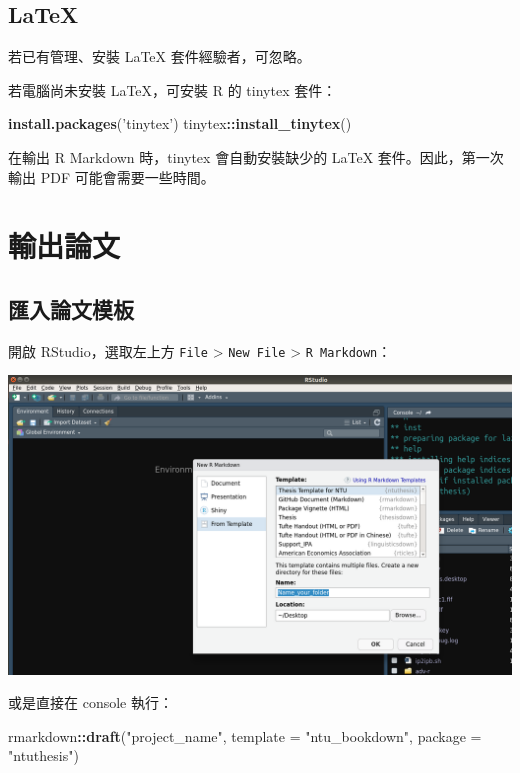 \documentclass[oneside]{book}
\newenvironment{Shaded}{\begin{snugshade}}{\end{snugshade}}
\newcommand{\KeywordTok}[1]{\textcolor[rgb]{0.13,0.29,0.53}{\textbf{#1}}}
\newcommand{\DataTypeTok}[1]{\textcolor[rgb]{0.13,0.29,0.53}{#1}}
\newcommand{\StringTok}[1]{\textcolor[rgb]{0.31,0.60,0.02}{#1}}
\newcommand{\OperatorTok}[1]{\textcolor[rgb]{0.81,0.36,0.00}{\textbf{#1}}}
\newcommand{\NormalTok}[1]{#1}
\begin{document}
\section{LaTeX}\label{latex}

若已有管理、安裝 LaTeX 套件經驗者，可忽略。

若電腦尚未安裝 LaTeX，可安裝 R 的 tinytex 套件：

\begin{Shaded}
\begin{Highlighting}[]
\KeywordTok{install.packages}\NormalTok{(}\StringTok{'tinytex'}\NormalTok{)}
\NormalTok{tinytex}\OperatorTok{::}\KeywordTok{install_tinytex}\NormalTok{()}
\end{Highlighting}
\end{Shaded}

在輸出 R Markdown 時，tinytex 會自動安裝缺少的 LaTeX
套件。因此，第一次輸出 PDF 可能會需要一些時間。

\chapter{輸出論文}\label{export-thesis}

\section{匯入論文模板}\label{import-template}

開啟 RStudio，選取左上方 \texttt{File} \textgreater{} \texttt{New\ File}
\textgreater{} \texttt{R\ Markdown}：

\begin{center}\includegraphics[width=0.9\linewidth]{figs/rmd-template} \end{center}

或是直接在 console 執行：

\begin{Shaded}
\begin{Highlighting}[]
\NormalTok{rmarkdown}\OperatorTok{::}\KeywordTok{draft}\NormalTok{(}\StringTok{"project_name"}\NormalTok{,}
                 \DataTypeTok{template =} \StringTok{"ntu_bookdown"}\NormalTok{,}
                 \DataTypeTok{package =} \StringTok{"ntuthesis"}\NormalTok{)}
\end{Highlighting}
\end{Shaded}
\end{document}
